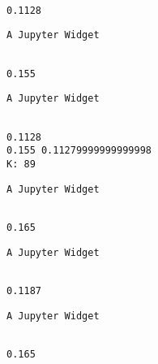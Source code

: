 \documentclass[11pt]{article}
\begin{document}
    
    \begin{Verbatim}[commandchars=\\\{\}]

0.1128

    \end{Verbatim}

    
    \begin{verbatim}
A Jupyter Widget
    \end{verbatim}

    
    \begin{Verbatim}[commandchars=\\\{\}]

0.155

    \end{Verbatim}

    
    \begin{verbatim}
A Jupyter Widget
    \end{verbatim}

    
    \begin{Verbatim}[commandchars=\\\{\}]

0.1128
0.155 0.11279999999999998
K: 89

    \end{Verbatim}

    
    \begin{verbatim}
A Jupyter Widget
    \end{verbatim}

    
    \begin{Verbatim}[commandchars=\\\{\}]

0.165

    \end{Verbatim}

    
    \begin{verbatim}
A Jupyter Widget
    \end{verbatim}

    
    \begin{Verbatim}[commandchars=\\\{\}]

0.1187

    \end{Verbatim}

    
    \begin{verbatim}
A Jupyter Widget
    \end{verbatim}

    
    \begin{Verbatim}[commandchars=\\\{\}]

0.165

    \end{Verbatim}
\end{document}

